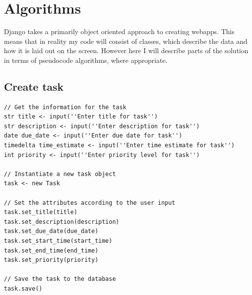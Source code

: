 \documentclass{article}
\begin{document}
\section{Algorithms}
Django takes a primarily object oriented approach to creating webapps.
This means that in reality my code will consist of classes,
which describe the data and how it is laid out on the screen.
However here I will describe parts of the solution in terms of pseudocode algorithms,
where appropriate.

\subsection{Create task}
\begin{lstlisting}[breaklines]
// Get the information for the task
str title <- input(''Enter title for task'')
str description <- input(''Enter description for task'')
date due_date <- input(''Enter due date for task'')
timedelta time_estimate <- input(''Enter time estimate for task'')
int priority <- input(''Enter priority level for task'')

// Instantiate a new task object
task <- new Task

// Set the attributes according to the user input
task.set_title(title)
task.set_description(description)
task.set_due_date(due_date)
task.set_start_time(start_time)
task.set_end_time(end_time)
task.set_priority(priority)

// Save the task to the database
task.save()
\end{lstlisting}
\end{document}

